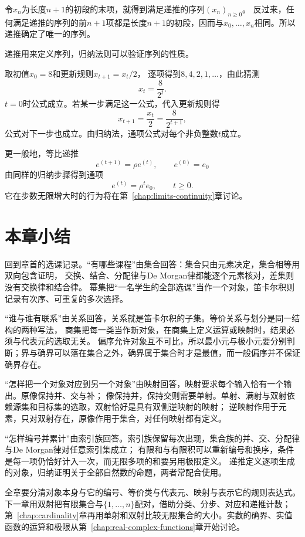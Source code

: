 令$x_n$为长度$n+1$的初段的末项，就得到满足递推的序列$(x_n)_{n\geq0}$。
反过来，任何满足递推的序列的前$n+1$项都是长度$n+1$的初段，因而与$x_0,\ldots,x_n$相同。所以递推确定了唯一的序列。

递推用来定义序列，归纳法则可以验证序列的性质。
\begin{example}[折半递推的通项]
\label{ex:sets-halving-recurrence}
取初值$x_0=8$和更新规则$x_{t+1}=x_t/2$，
逐项得到$8,4,2,1,\ldots$，由此猜测
\[
 x_t=\frac{8}{2^t}.
\]
$t=0$时公式成立。若某一步满足这一公式，代入更新规则得
\[
 x_{t+1}=\frac{x_t}{2}=\frac{8}{2^{t+1}},
\]
公式对下一步也成立。由归纳法，通项公式对每个非负整数$t$成立。
\end{example}

更一般地，等比递推
\begin{equation}
 e^{(t+1)}=\rho e^{(t)},\qquad e^{(0)}=e_0
 \label{eq:prelim-geometric-recurrence}
\end{equation}
由同样的归纳步骤得到通项
\begin{equation}
 e^{(t)}=\rho^te_0,\qquad t\geq0.
 \label{eq:prelim-geometric-recurrence-solution}
\end{equation}
它在步数无限增大时的行为将在第~\ref{chap:limits-continuity}章讨论。

\section{本章小结}
\label{sec:prelim-sets-functions-summary}

回到章首的选课记录。“有哪些课程”由集合回答：集合只由元素决定，集合相等用双向包含证明，
交换、结合、分配律与De Morgan律都能逐个元素核对，差集则没有交换律和结合律。
幂集把“一名学生的全部选课”当作一个对象，笛卡尔积则记录有次序、可重复的多次选择。

“谁与谁有联系”由关系回答，关系就是笛卡尔积的子集。等价关系与划分是同一结构的两种写法，
商集把每一类当作新对象，在商集上定义运算或映射时，结果必须与代表元的选取无关。
偏序允许对象互不可比，所以最小元与极小元要分别判断；界与确界可以落在集合之外，确界属于集合时才是最值，而一般偏序并不保证确界存在。

“怎样把一个对象对应到另一个对象”由映射回答，映射要求每个输入恰有一个输出。原像保持并、交与补；
像保持并，保持交则需要单射。单射、满射与双射依赖源集和目标集的选取，双射恰好是具有双侧逆映射的映射；
逆映射作用于元素，只对双射存在，原像作用于集合，对任何映射都有定义。

“怎样编号并累计”由索引族回答。索引族保留每次出现，集合族的并、交、分配律与De Morgan律对任意索引集成立；
有限和与有限积可以重新编号和换序，条件是每一项仍恰好计入一次，而无限多项的和要另用极限定义。
递推定义逐项生成的对象，归纳证明关于全部自然数的命题，两者常配合使用。

全章要分清对象本身与它的编号、等价类与代表元、映射与表示它的规则表达式。
下一章用双射把有限集合与$\{1,\ldots,n\}$配对，借助分类、分步、对应和递推计数；
第~\ref{chap:cardinality}章再用单射和双射比较无限集合的大小。实数的确界、实值函数的运算和极限从第~\ref{chap:real-complex-functions}章开始讨论。
